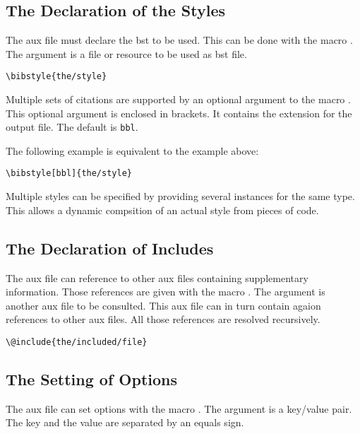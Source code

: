 \subsection{The Declaration of the Styles}

The aux file must declare the bst to be used. This can be done with
the macro . The argument is a file or resource to be
used as bst file.

\begin{lstlisting}[language={[LaTeX]TeX}]
  \bibstyle{the/style}
\end{lstlisting}

Multiple sets of citations are supported by an optional argument to
the macro . This optional argument is enclosed in
brackets. It contains the extension for the output file. The default
is \texttt{bbl}.

The following example is equivalent to the example above:

\begin{lstlisting}[language={[LaTeX]TeX}]
  \bibstyle[bbl]{the/style}
\end{lstlisting}

Multiple styles can be specified by providing several 
instances for the same type. This allows a dynamic compsition of an
actual style from pieces of code.


\subsection{The Declaration of Includes}

The aux file can reference to other aux files containing supplementary
information. Those references are given  with the macro
. The argument is another aux file to be consulted.
This aux file can in turn contain agaion references to other aux
files. All those references are resolved recursively.

\begin{lstlisting}[language={[LaTeX]TeX},%
  alsoletter={@},morekeywords={@include}]
  \@include{the/included/file}
\end{lstlisting}


\subsection{The Setting of Options}

The aux file can set options with the macro . The
argument is a key/value pair. The key and the value are separated by
an equals sign.

